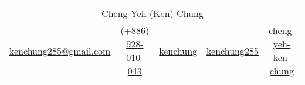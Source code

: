 \begin{center}
    \begin{tabular}{c|c|c|c|c}
        \multicolumn{5}{c}{\LARGE{Cheng-Yeh (Ken) Chung}} \\[6pt]
        \href{mailto:kenchung285@gmail.com}{\raisebox{-0.05\height}{\faEnvelope} kenchung285@gmail.com} &
        \href{tel:+886928010043}{\raisebox{-0.05\height}{\faMobile} (+886) 928-010-043} &
        \href{https://kenchung285.github.io}{\raisebox{-0.05\height}{\faHome} kenchung} &
        \href{https://github.com/kenchung285}{\raisebox{-0.05\height}{\faGithub} kenchung285} &
        \href{https://www.linkedin.com/in/cheng-yeh-ken-chung}{\raisebox{-0.05\height}{\faLinkedin} cheng-yeh-ken-chung}
    \end{tabular}
\end{center}